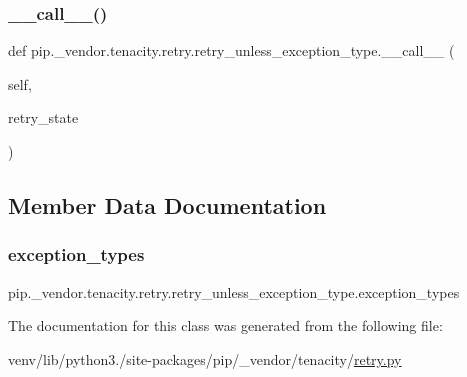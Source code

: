 \subsubsection{\texorpdfstring{\+\_\+\+\_\+call\+\_\+\+\_\+()}{\_\_call\_\_()}}
{\footnotesize\ttfamily def pip.\+\_\+vendor.\+tenacity.\+retry.\+retry\+\_\+unless\+\_\+exception\+\_\+type.\+\_\+\+\_\+call\+\_\+\+\_\+ (\begin{DoxyParamCaption}\item[{}]{self,  }\item[{}]{retry\+\_\+state }\end{DoxyParamCaption})}



\subsection{Member Data Documentation}
\mbox{\label{classpip_1_1__vendor_1_1tenacity_1_1retry_1_1retry__unless__exception__type_a6435cde0125c609b4e1227ccffdc417c}} 
\subsubsection{\texorpdfstring{exception\+\_\+types}{exception\_types}}
{\footnotesize\ttfamily pip.\+\_\+vendor.\+tenacity.\+retry.\+retry\+\_\+unless\+\_\+exception\+\_\+type.\+exception\+\_\+types\hspace{0.3cm}{\ttfamily [static]}}



The documentation for this class was generated from the following file\+:\begin{DoxyCompactItemize}
\item 
venv/lib/python3./site-\/packages/pip/\+\_\+vendor/tenacity/\hyperlink{tenacity_2retry_8py}{retry.\+py}\end{DoxyCompactItemize}
